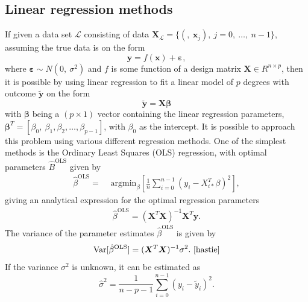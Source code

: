 \documentclass[a4paper, 10pt]{article}
\begin{document}
\begin{multicols}{2}
\subsection{Linear regression methods}
\label{subsec:LinReg}
If given a data set $\mathcal{L}$ consisting of data $\bm{X}_\mathcal{L} = \{(	,\ \bm{x}_j),\ j=0,\ \dots,\ n-1\}$, assuming the true data is on the form
\begin{equation}
\bm{y} = f(\bm{x})+ \bm{\varepsilon} ,
\end{equation}
where $\bm{\varepsilon} \sim N(0,\ \sigma ^2)$ and $f$ is some function of a design matrix $\bm{X}\in R^{n\times p}$, then it is possible by using linear regression to fit a linear model of $p$ degrees with outcome $\bm{\tilde{y}}$ on the form
\begin{equation}
\bm{\tilde{y}} = \bm{X}\bm{\beta}  \label{eq:y=Xbeta}
\end{equation}
with $\bm{\beta}$ being a $(p\times 1)$ vector containing the linear regression parameters, $\bm{\beta}^T=[\beta_0,\ \beta_1, \beta_2,\dots,\beta_{p-1}]$, with $\beta_0$ as the intercept.
It is possible to approach this problem using various different regression methods. One of the simplest methods is the Ordinary Least Squares (OLS) regression, with optimal  parameters $\hat{B}^\text{OLS}$ given by
\begin{align}
    \hat{\beta}^\text{OLS} =& \text{ argmin}_{ {\beta} } \left[ \frac{1}{n} \sum_{i=0}^{n-1} (y_i - X_{i*}^T \beta)^2 \right],
    \label{eq:argminbeta_OLS} 
\end{align}
giving an analytical expression for the optimal regression parameters
\begin{align}
    \hat{\beta}^{\text{OLS}} = (\bm{X}^T\bm{X})^{-1} \bm{X}^T \bm{y}.
    \label{eq:beta_OLS}
\end{align}
The variance of the parameter estimates $ \hat{\beta}^{\text{OLS}} $ is given by
\begin{equation}
\label{eq:betavariance}
\text{Var} [\hat{\beta}^{\text{OLS}} ] = (\bm{X}^T\bm{X})^{-1}\sigma^2.\  \cite{hastie}
\end{equation}
If the variance $\sigma^2$ is unknown, it can be estimated as 
\begin{equation}
\label{eq:variance}
\hat{\sigma}^2  = \frac{1}{n-p-1}\sum_{i=0}^{n-1}(y_i-\tilde{y}_i)^2.
\end{equation}


\end{multicols}
\end{document}
